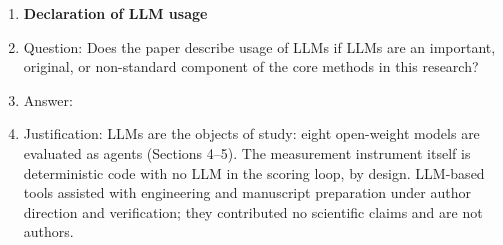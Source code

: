 \documentclass{article}
\begin{document}
\begin{enumerate}
\item {\bf Declaration of LLM usage}
    \item[] Question: Does the paper describe usage of LLMs if LLMs are an important, original, or non-standard component of the core methods in this research?
    \item[] Answer: \answerYes{}
    \item[] Justification: LLMs are the objects of study: eight open-weight models are evaluated as agents (Sections 4--5). The measurement instrument itself is deterministic code with no LLM in the scoring loop, by design. LLM-based tools assisted with engineering and manuscript preparation under author direction and verification; they contributed no scientific claims and are not authors.

\end{enumerate}
\end{document}
